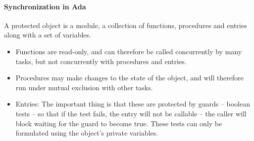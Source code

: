 \paragraph{Synchronization in Ada} A protected object is a module, a collection of functions, procedures and entries along with a set of variables.
\begin{itemize}[nolistsep,noitemsep]
  \item Functions are read-only, and can therefore be called concurrently by many tasks, but not concurrently with procedures and entries.
  \item Procedures may make changes to the state of the object, and will therefore run under mutual exclusion with other tasks.
  \item Entries: The important thing is that these are protected by guards -- boolean tests -- so that if the test fails, the entry will not be callable -- the caller will block waiting for the guard to become true. These tests can only be formulated using the object's private variables.
\end{itemize}

